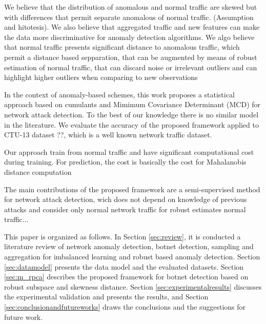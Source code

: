 \documentclass[review]{elsarticle}
\begin{document}
We believe that the distribution of anomalous and normal traffic are skewed but with differences that permit separate anomalous of normal traffic. (Assumption and hitotesis). We also believe that aggregated traffic and new features can make the data more discriminative for anomaly detection algorithms. We algo believe that normal traffic presents significant distance to anomalous traffic, which permit a distance based sepparation, that can be augmented by means of robust estimation of normal traffic, that can discard noise or irrelevant outliers and can highlight higher outliers when comparing to new observations

In the context of anomaly-based schemes, this work proposes a statistical approach based on cumulants and Mimimum Covariance Determinant (MCD) for network attack detection. To the best of our knowledge there is no similar model in the literature. We evaluate the accuracy of the proposed framework applied to CTU-13 dataset ??, which is a well known network traffic dataset.

Our approach train from normal traffic and have significant computational cost during training. For prediction, the cost is basically the cost for Mahalanobis distance computation

The main contributions of the proposed framework are a semi-supervised method for network attack detection, wich does not depend on knowledge of previous attacks and consider only normal network traffic for robust estimates normal traffic...

This paper is organized as follows. In Section \ref{sec:review}, it is conducted a literature review of network anomaly detection, botnet detection, sampling and aggregation for imbalanced learning and robust based anomaly detection. Section \ref{sec:datamodel} presents the data model and the evaluated datasets. Section \ref{sec:m_rpca} describes the proposed framework for botnet detection based on robust subspace and skewness distance. Section \ref{sec:experimentalresults} discusses the experimental validation and presents the results, and Section \ref{sec:conclusionandfutureworks} draws the conclusions and the suggestions for future work.

\end{document}
